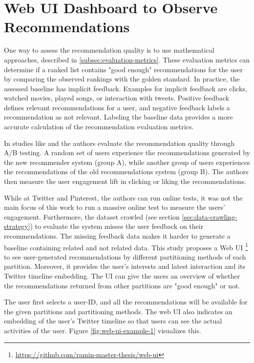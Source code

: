 \section{Web UI Dashboard to Observe Recommendations}
\label{sec:web-ui}
One way to assess the recommendation quality is to use mathematical approaches, described in \ref{subsec:evaluation-metrics}. These evaluation metrics can determine if a ranked list contains "good enough" recommendations for the user by comparing the observed rankings with the golden standard. In practice, the assessed baseline has implicit feedback. Examples for implicit feedback are clicks, watched movies, played songs, or interaction with tweets. Positive feedback defines relevant recommendations for a user, and negative feedback labels a recommendation as not relevant. Labeling the baseline data provides a more accurate calculation of the recommendation evaluation metrics.


In studies like \cite{eksombatchaiPixieSystemRecommending2018} and \cite{goelWhoToFollowSystemTwitter2015} the authors evaluate the recommendation quality through A/B testing. A random set of users experience the recommendations generated by the new recommender system (group A), while another group of users experiences the recommendations of the old recommendations system (group B). The authors then measure the user engagement lift in clicking or liking the recommendations. 


While at Twitter and Pinterest, the authors can run online tests, it was not the main focus of this work to run a massive online test to measure the users' engagement. Furthermore, the dataset crawled (see section \ref{sec:data-crawling-strategy}) to evaluate the system misses the user feedback on their recommendations. The missing feedback data makes it harder to generate a baseline containing related and not related data. This study proposes a Web UI \footnote{\url{https://github.com/ramin-master-thesis/web-ui}} to see user-generated recommendations by different partitioning methods of each partition. Moreover, it provides the user's interests and latest interaction and its Twitter timeline embedding. The UI can give the users an overview of whether the recommendations returned from other partitions are "good enough" or not.


The user first selects a user-ID, and all the recommendations will be available for the given partitions and partitioning methods. The web UI also indicates an embedding of the user's Twitter timeline so that users can see the actual activities of the user. Figure \ref{fig:web-ui-example-1} visualizes this.


